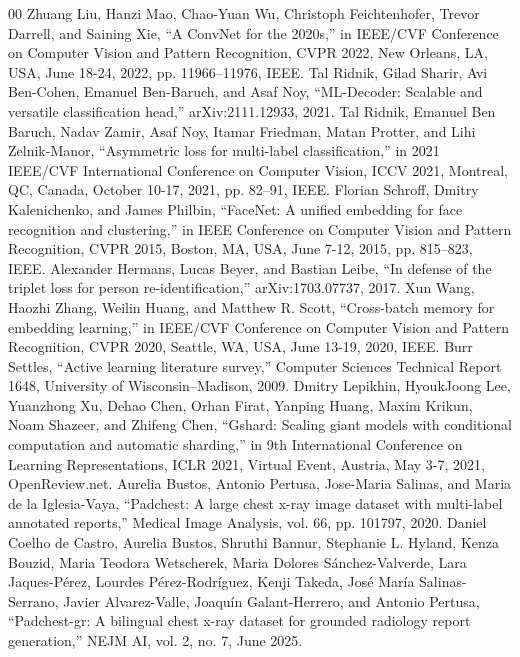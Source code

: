 \documentclass[conference]{IEEEtran}
\begin{document}
\begin{thebibliography}{00}
 Zhuang Liu, Hanzi Mao, Chao-Yuan Wu, Christoph Feichtenhofer, Trevor Darrell, and Saining Xie, ``A ConvNet for the 2020s,'' in IEEE/CVF Conference on Computer Vision and Pattern Recognition, CVPR 2022, New Orleans, LA, USA, June 18-24, 2022, pp. 11966--11976, IEEE.
 Tal Ridnik, Gilad Sharir, Avi Ben-Cohen, Emanuel Ben-Baruch, and Asaf Noy, ``ML-Decoder: Scalable and versatile classification head,'' arXiv:2111.12933, 2021.
 Tal Ridnik, Emanuel Ben Baruch, Nadav Zamir, Asaf Noy, Itamar Friedman, Matan Protter, and Lihi Zelnik-Manor, ``Asymmetric loss for multi-label classification,'' in 2021 IEEE/CVF International Conference on Computer Vision, ICCV 2021, Montreal, QC, Canada, October 10-17, 2021, pp. 82--91, IEEE.
 Florian Schroff, Dmitry Kalenichenko, and James Philbin, ``FaceNet: A unified embedding for face recognition and clustering,'' in IEEE Conference on Computer Vision and Pattern Recognition, CVPR 2015, Boston, MA, USA, June 7-12, 2015, pp. 815--823, IEEE.
 Alexander Hermans, Lucas Beyer, and Bastian Leibe, ``In defense of the triplet loss for person re-identification,'' arXiv:1703.07737, 2017.
 Xun Wang, Haozhi Zhang, Weilin Huang, and Matthew R. Scott, ``Cross-batch memory for embedding learning,'' in IEEE/CVF Conference on Computer Vision and Pattern Recognition, CVPR 2020, Seattle, WA, USA, June 13-19, 2020, IEEE.
 Burr Settles, ``Active learning literature survey,'' Computer Sciences Technical Report 1648, University of Wisconsin--Madison, 2009.
 Dmitry Lepikhin, HyoukJoong Lee, Yuanzhong Xu, Dehao Chen, Orhan Firat, Yanping Huang, Maxim Krikun, Noam Shazeer, and Zhifeng Chen, ``Gshard: Scaling giant models with conditional computation and automatic sharding,'' in 9th International Conference on Learning Representations, ICLR 2021, Virtual Event, Austria, May 3-7, 2021, OpenReview.net.
 Aurelia Bustos, Antonio Pertusa, Jose-Maria Salinas, and Maria de la Iglesia-Vaya, ``Padchest: A large chest x-ray image dataset with multi-label annotated reports,'' Medical Image Analysis, vol. 66, pp. 101797, 2020.
 Daniel Coelho de Castro, Aurelia Bustos, Shruthi Bannur, Stephanie L. Hyland, Kenza Bouzid, Maria Teodora Wetscherek, Maria Dolores S\'anchez-Valverde, Lara Jaques-P\'erez, Lourdes P\'erez-Rodr\'iguez, Kenji Takeda, Jos\'e Mar\'ia Salinas-Serrano, Javier Alvarez-Valle, Joaqu\'in Galant-Herrero, and Antonio Pertusa, ``Padchest-gr: A bilingual chest x-ray dataset for grounded radiology report generation,'' NEJM AI, vol. 2, no. 7, June 2025.

\end{thebibliography}
\end{document}
